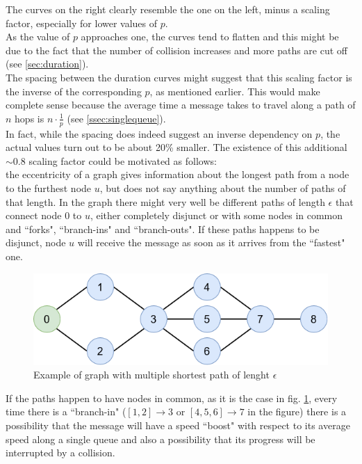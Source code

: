 \hfill \break
The curves on the right clearly resemble the one on the left, minus a scaling factor, especially for lower values of $p$.\\
As the value of $p$ approaches one, the curves tend to flatten and this might be due to the fact that the number of collision increases and more paths are cut off (see \ref{sec:duration}).\\
The spacing between the duration curves might suggest that this scaling factor is the inverse of the corresponding $p$, as mentioned earlier. This would make complete sense because the average time a message takes to travel along a path of $n$ hops is $n \cdot \frac{1}{p}$ (see \ref{ssec:singlequeue}).\\
In fact, while the spacing does indeed suggest an inverse dependency on $p$, the actual values turn out to be about 20\% smaller. The existence of this additional $\sim0.8$ scaling factor could be motivated as follows:\\
the eccentricity of a graph gives information about the longest path from a node to the furthest node $u$, but does not say anything about the number of paths of that length. In the graph there might very well be different paths of length $\epsilon$ that connect node 0 to $u$, either completely disjunct or with some nodes in common and ``forks", ``branch-ins" and ``branch-outs". If these paths happens to be disjunct, node $u$ will receive the message as soon as it arrives from the ``fastest" one. 

\begin{figure}

\includegraphics[width=1\linewidth]{img/branchIn.png} 
\caption{Example of graph with multiple shortest path of lenght $\epsilon$}
\label{fig:branchIn}
\end{figure}

If the paths happen to have nodes in common, as it is the case in fig. \ref{fig:branchIn}, every time there is a ``branch-in" ($[1,2]{\to}3$ or $[4,5,6]{\to}7$ in the figure) there is a possibility that the message will have a speed ``boost" with respect to its average speed along a single queue and also a possibility that its progress will be interrupted by a collision.

